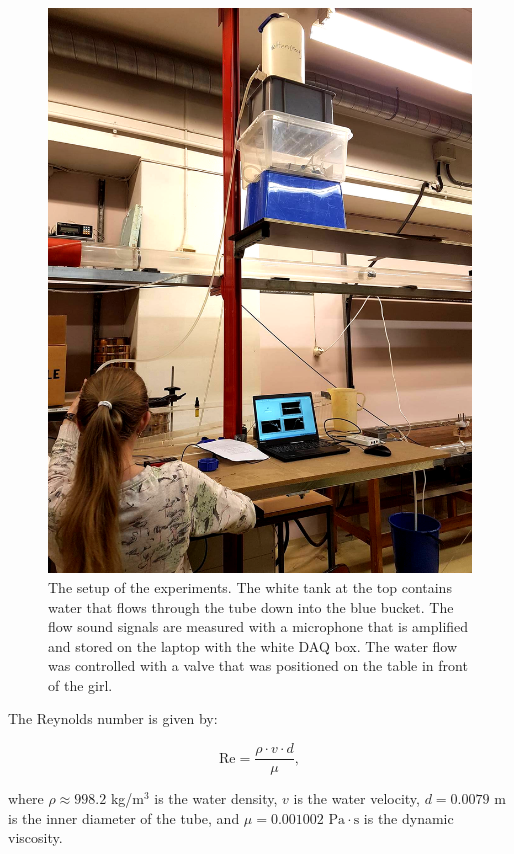 \documentclass[english,a4paper,12pt]{article}
\begin{document}
\begin{figure}[H]
    \centering
    \includegraphics[width=150mm]{ExperimentSetup.png}
    \caption{The setup of the experiments. The white tank at the top contains water that flows through the tube down into the blue bucket. The flow sound signals are measured with a microphone that is amplified and stored on the laptop with the white DAQ box. The water flow was controlled with a valve that was positioned on the table in front of the girl.}
    \label{fig:1}
\end{figure}

The Reynolds number is given by:

$$\text{Re} = \frac{\rho \cdot v \cdot d}{\mu},$$

where $\rho \approx 998.2$ kg/m$^3$ is the water density, $v$ is the water velocity, $d = 0.0079$ m is the inner diameter of the tube, and $\mu = 0.001002 \text{ Pa} \cdot \text{s}$ is the dynamic viscosity. \smallskip
\end{document}

